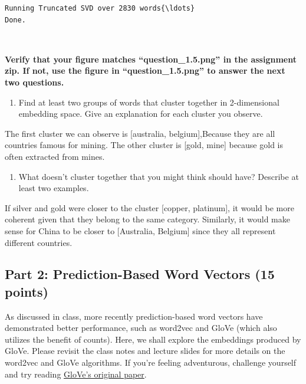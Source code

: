 \documentclass[11pt]{article}
\providecommand{\tightlist}{%
      \setlength{\itemsep}{0pt}\setlength{\parskip}{0pt}}
\begin{document}
    \begin{Verbatim}[commandchars=\\\{\}]
Running Truncated SVD over 2830 words{\ldots}
Done.
    \end{Verbatim}

    \begin{center}
    \end{center}
    { \hspace*{\fill} \\}
    
    \textbf{Verify that your figure matches ``question\_1.5.png'' in the
assignment zip. If not, use the figure in ``question\_1.5.png'' to
answer the next two questions.}

    \begin{enumerate}
\def\labelenumi{\alph{enumi}.}
\tightlist
\item
  Find at least two groups of words that cluster together in
  2-dimensional embedding space. Give an explanation for each cluster
  you observe.
\end{enumerate}

    The first cluster we can observe is {[}australia, belgium{]},Because
they are all countries famous for mining. The other cluster is {[}gold,
mine{]} because gold is often extracted from mines.

    \begin{enumerate}
\def\labelenumi{\alph{enumi}.}
\setcounter{enumi}{1}
\tightlist
\item
  What doesn't cluster together that you might think should have?
  Describe at least two examples.
\end{enumerate}

    If silver and gold were closer to the cluster {[}copper, platinum{]}, it
would be more coherent given that they belong to the same category.
Similarly, it would make sense for China to be closer to {[}Australia,
Belgium{]} since they all represent different countries.

    \subsection{Part 2: Prediction-Based Word Vectors (15
points)}\label{part-2-prediction-based-word-vectors-15-points}

As discussed in class, more recently prediction-based word vectors have
demonstrated better performance, such as word2vec and GloVe (which also
utilizes the benefit of counts). Here, we shall explore the embeddings
produced by GloVe. Please revisit the class notes and lecture slides for
more details on the word2vec and GloVe algorithms. If you're feeling
adventurous, challenge yourself and try reading
\href{https://nlp.stanford.edu/pubs/glove.pdf}{GloVe's original paper}.
\end{document}

